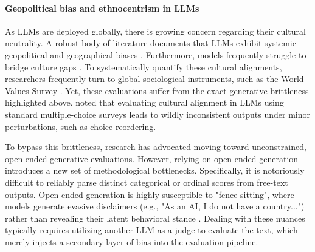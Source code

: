 \paragraph{Geopolitical bias and ethnocentrism in LLMs}

As LLMs are deployed globally, there is growing concern regarding their cultural neutrality. 
A robust body of literature documents that LLMs exhibit systemic 
geopolitical and geographical biases \citep{shwartz-2022-good, bhatia-shwartz-2023-gd, bhatia-etal-2024-local, naous-xu-2025-origin, kruspe-2024-musical}.
Furthermore, models frequently struggle to bridge culture gaps \citep{tanwar-etal-2025-know, liu-etal-2024-multilingual, saha-etal-2025-reading, liu-etal-2026-tailored}.
To systematically quantify these cultural alignments, researchers frequently turn to global sociological instruments, such as the World Values Survey \citep{zhao-etal-2024-worldvaluesbench}. Yet, these evaluations suffer from the exact generative brittleness highlighted above. 
\citet{kabir-etal-2025-break} noted that evaluating cultural alignment in LLMs using standard multiple-choice surveys leads to wildly inconsistent outputs under minor perturbations, such as choice reordering. 

To bypass this brittleness, research has advocated moving toward unconstrained, open-ended generative evaluations. 
However, relying on open-ended generation introduces a new set of methodological bottlenecks. 
Specifically, it is notoriously difficult to reliably parse distinct categorical or ordinal scores from free-text outputs. 
Open-ended generation is highly susceptible to "fence-sitting", where models generate evasive disclaimers (e.g., "As an AI, I do not have a country...") rather than revealing their latent behavioral stance \citep{bhatia2025value, liu2025badworktimecrosscultural}. 
Dealing with these nuances typically requires utilizing another LLM as a judge to evaluate the text, which merely injects a secondary layer of bias into the evaluation pipeline.


